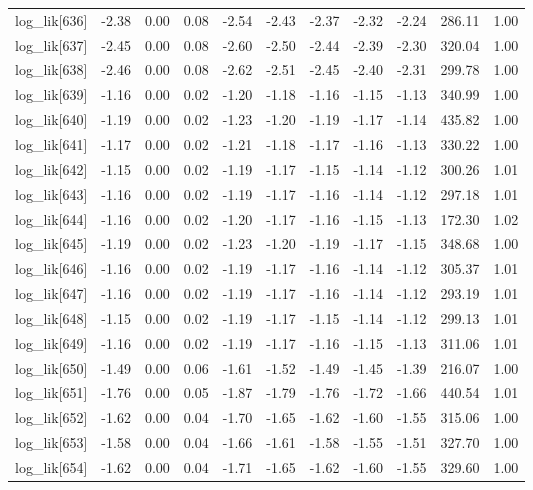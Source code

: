 \begin{table}[ht]
\begin{tabular}{rrrrrrrrrrr}
  log\_lik[636] & -2.38 & 0.00 & 0.08 & -2.54 & -2.43 & -2.37 & -2.32 & -2.24 & 286.11 & 1.00 \\ 
  log\_lik[637] & -2.45 & 0.00 & 0.08 & -2.60 & -2.50 & -2.44 & -2.39 & -2.30 & 320.04 & 1.00 \\ 
  log\_lik[638] & -2.46 & 0.00 & 0.08 & -2.62 & -2.51 & -2.45 & -2.40 & -2.31 & 299.78 & 1.00 \\ 
  log\_lik[639] & -1.16 & 0.00 & 0.02 & -1.20 & -1.18 & -1.16 & -1.15 & -1.13 & 340.99 & 1.00 \\ 
  log\_lik[640] & -1.19 & 0.00 & 0.02 & -1.23 & -1.20 & -1.19 & -1.17 & -1.14 & 435.82 & 1.00 \\ 
  log\_lik[641] & -1.17 & 0.00 & 0.02 & -1.21 & -1.18 & -1.17 & -1.16 & -1.13 & 330.22 & 1.00 \\ 
  log\_lik[642] & -1.15 & 0.00 & 0.02 & -1.19 & -1.17 & -1.15 & -1.14 & -1.12 & 300.26 & 1.01 \\ 
  log\_lik[643] & -1.16 & 0.00 & 0.02 & -1.19 & -1.17 & -1.16 & -1.14 & -1.12 & 297.18 & 1.01 \\ 
  log\_lik[644] & -1.16 & 0.00 & 0.02 & -1.20 & -1.17 & -1.16 & -1.15 & -1.13 & 172.30 & 1.02 \\ 
  log\_lik[645] & -1.19 & 0.00 & 0.02 & -1.23 & -1.20 & -1.19 & -1.17 & -1.15 & 348.68 & 1.00 \\ 
  log\_lik[646] & -1.16 & 0.00 & 0.02 & -1.19 & -1.17 & -1.16 & -1.14 & -1.12 & 305.37 & 1.01 \\ 
  log\_lik[647] & -1.16 & 0.00 & 0.02 & -1.19 & -1.17 & -1.16 & -1.14 & -1.12 & 293.19 & 1.01 \\ 
  log\_lik[648] & -1.15 & 0.00 & 0.02 & -1.19 & -1.17 & -1.15 & -1.14 & -1.12 & 299.13 & 1.01 \\ 
  log\_lik[649] & -1.16 & 0.00 & 0.02 & -1.19 & -1.17 & -1.16 & -1.15 & -1.13 & 311.06 & 1.01 \\ 
  log\_lik[650] & -1.49 & 0.00 & 0.06 & -1.61 & -1.52 & -1.49 & -1.45 & -1.39 & 216.07 & 1.00 \\ 
  log\_lik[651] & -1.76 & 0.00 & 0.05 & -1.87 & -1.79 & -1.76 & -1.72 & -1.66 & 440.54 & 1.01 \\ 
  log\_lik[652] & -1.62 & 0.00 & 0.04 & -1.70 & -1.65 & -1.62 & -1.60 & -1.55 & 315.06 & 1.00 \\ 
  log\_lik[653] & -1.58 & 0.00 & 0.04 & -1.66 & -1.61 & -1.58 & -1.55 & -1.51 & 327.70 & 1.00 \\ 
  log\_lik[654] & -1.62 & 0.00 & 0.04 & -1.71 & -1.65 & -1.62 & -1.60 & -1.55 & 329.60 & 1.00 \\ 

\end{tabular}
\end{table}
